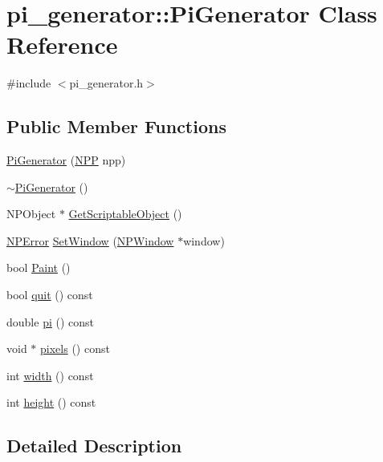\hypertarget{classpi__generator_1_1_pi_generator}{
\section{pi\_\-generator::PiGenerator Class Reference}
\label{classpi__generator_1_1_pi_generator}
}


{\ttfamily \#include $<$pi\_\-generator.h$>$}

\subsection*{Public Member Functions}
\begin{DoxyCompactItemize}
\item 
\hyperlink{classpi__generator_1_1_pi_generator_a0f5a55bbb942dee1b185447f0a7e24be}{PiGenerator} (\hyperlink{struct___n_p_p}{NPP} npp)
\item 
\hyperlink{classpi__generator_1_1_pi_generator_ac7d9c07492fd86678b8f66643e1e8c1e}{$\sim$PiGenerator} ()
\item 
NPObject $\ast$ \hyperlink{classpi__generator_1_1_pi_generator_ac65f31616ae3d223bdc01b91aea91762}{GetScriptableObject} ()
\item 
\hyperlink{npapi_8h_a56715bc92ac93f0447a05f852ce18828}{NPError} \hyperlink{classpi__generator_1_1_pi_generator_ad19c9de44971a5c08ee8e26a45598f38}{SetWindow} (\hyperlink{struct___n_p_window}{NPWindow} $\ast$window)
\item 
bool \hyperlink{classpi__generator_1_1_pi_generator_a47540afa1d21ef0b6e6ea7d986b71243}{Paint} ()
\item 
bool \hyperlink{classpi__generator_1_1_pi_generator_a02e8796485d878cbe8a42dcc2b204c4a}{quit} () const 
\item 
double \hyperlink{classpi__generator_1_1_pi_generator_a74119d27c1a01b50b91677f8089a0103}{pi} () const 
\item 
void $\ast$ \hyperlink{classpi__generator_1_1_pi_generator_a3e4279bb7732861b21ab6d1dcfc27429}{pixels} () const 
\item 
int \hyperlink{classpi__generator_1_1_pi_generator_ae3b2d276f4cf6209d7653f6fc4437fc4}{width} () const 
\item 
int \hyperlink{classpi__generator_1_1_pi_generator_a7cdc6f6c02a01a63e813c8357e901fb9}{height} () const 
\end{DoxyCompactItemize}


\subsection{Detailed Description}


